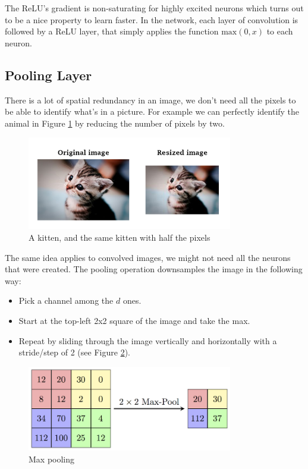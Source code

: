 The ReLU's gradient is non-saturating for highly excited neurons which turns out to be a nice property to learn faster. In the network, each layer of convolution is followed by a ReLU layer, that simply applies the function $\text{max}(0,x)$ to each neuron.

\newpage
\subsection{Pooling Layer}
There is a lot of spatial redundancy in an image, we don't need all the pixels to be able to identify what's in a picture. For example we can perfectly identify the animal in Figure \ref{kittens} by reducing the number of pixels by two.

\begin{figure}[H]
\centering
\includegraphics[width=0.8\textwidth]{Images/kittens.png}
\caption{A kitten, and the same kitten with half the pixels}
\label{kittens}
\end{figure}

The same idea applies to convolved images, we might not need all the neurons that were created. The pooling operation downsamples the image in the following way:
\begin{itemize}
    \item Pick a channel among the $d$ ones.
    \item Start at the top-left 2x2 square of the image and take the max.
    \item Repeat by sliding through the image vertically and horizontally with a stride/step of 2 (see Figure \ref{maxpool}).
\end{itemize}

\begin{figure}[H]
\centering
\includegraphics[width=0.8\textwidth]{Images/maxpool.png}
\caption{Max pooling \cite{camb-spark}}
\label{maxpool}
\end{figure}

